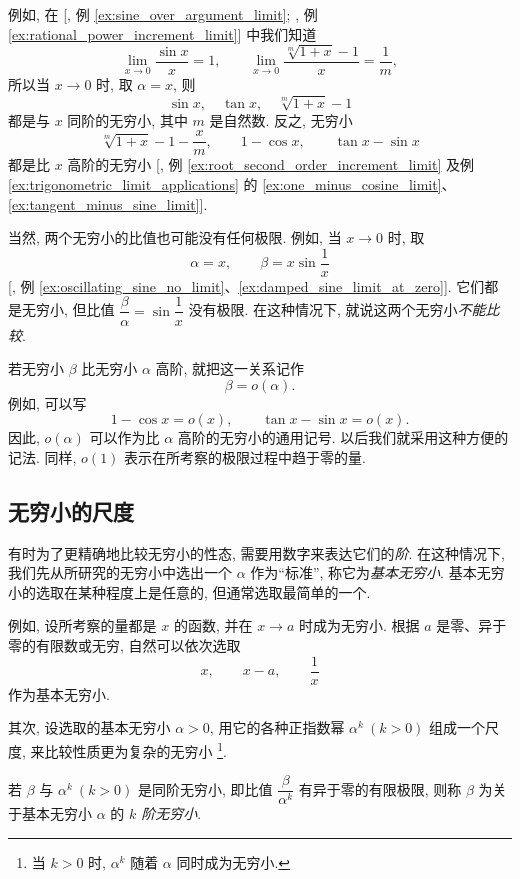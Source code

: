 例如, 在 [, 例 \ref{ex:sine_over_argument_limit};
, 例 \ref{ex:rational_power_increment_limit}] 中我们知道
$$
\lim_{x\to0}\frac{\sin x}{x}=1,\qquad
\lim_{x\to0}\frac{\sqrt[m]{1+x}-1}{x}=\frac1m,
$$
所以当 $x\to0$ 时, 取 $\alpha=x$, 则
$$
\sin x,\quad\tan x,\quad\sqrt[m]{1+x}-1
$$
都是与 $x$ 同阶的无穷小, 其中 $m$ 是自然数.
反之, 无穷小
\begin{equation}\label{eq:higher_order_than_x_examples}
\sqrt[m]{1+x}-1-\frac xm,\qquad1-\cos x,\qquad\tan x-\sin x
\end{equation}
都是比 $x$ 高阶的无穷小
[, 例 \ref{ex:root_second_order_increment_limit}
及例 \ref{ex:trigonometric_limit_applications} 的
\ref{ex:one_minus_cosine_limit}、\ref{ex:tangent_minus_sine_limit}].

当然, 两个无穷小的比值也可能没有任何极限.
例如, 当 $x\to0$ 时, 取
$$
\alpha=x,\qquad\beta=x\sin\frac1x
$$
[, 例 \ref{ex:oscillating_sine_no_limit}、\ref{ex:damped_sine_limit_at_zero}].
它们都是无穷小, 但比值 $\dfrac\beta\alpha=\sin\dfrac1x$ 没有极限.
在这种情况下, 就说这两个无穷小\emph{不能比较}.

若无穷小 $\beta$ 比无穷小 $\alpha$ 高阶, 就把这一关系记作
$$
\beta=o(\alpha).
$$
例如, 可以写
$$
1-\cos x=o(x),\qquad\tan x-\sin x=o(x).
$$
因此, $o(\alpha)$ 可以作为比 $\alpha$ 高阶的无穷小的通用记号.
以后我们就采用这种方便的记法.
同样, $o(1)$ 表示在所考察的极限过程中趋于零的量.

\subsection{无穷小的尺度}\label{subsec:61}
有时为了更精确地比较无穷小的性态, 需要用数字来表达它们的\emph{阶}.
在这种情况下, 我们先从所研究的无穷小中选出一个 $\alpha$ 作为“标准”,
称它为\emph{基本无穷小}\label{def:basic_infinitesimal}.
基本无穷小的选取在某种程度上是任意的, 但通常选取最简单的一个.

例如, 设所考察的量都是 $x$ 的函数, 并在 $x\to a$ 时成为无穷小.
根据 $a$ 是零、异于零的有限数或无穷, 自然可以依次选取
$$
x,\qquad x-a,\qquad\frac1x
$$
作为基本无穷小.

其次, 设选取的基本无穷小 $\alpha>0$,
用它的各种正指数幂 $\alpha^k\ (k>0)$ 组成一个尺度,
来比较性质更为复杂的无穷小
\footnote{当 $k>0$ 时, $\alpha^k$ 随着 $\alpha$ 同时成为无穷小.}.

\label{def:order_of_infinitesimal}
{\kaishu 若 $\beta$ 与 $\alpha^k\ (k>0)$ 是同阶无穷小,
即比值 $\dfrac\beta{\alpha^k}$ 有异于零的有限极限,
则称 $\beta$ 为关于基本无穷小 $\alpha$ 的
\emph{$k$ 阶无穷小}.}

